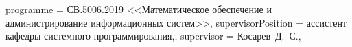 {	%
	programme          = {СВ.5006.2019 <<Математическое обеспечение и администрирование информационных систем>>},
	supervisorPosition = {ассистент кафедры системного программирования,},
	supervisor         = {Косарев~Д.~С.},
}

